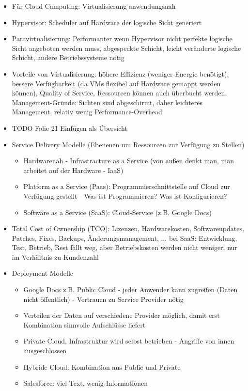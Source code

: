 \documentclass[paper=a4, fontsize=11pt]{scrartcl} %
\numberwithin{equation}{section} %
\numberwithin{figure}{section} %
\numberwithin{table}{section} %
\begin{document}
\begin{itemize}
  \item Für Cloud-Camputing: Virtualisierung anwendungsnah
  \item Hypervisor: Scheduler auf Hardware der logische Sicht generiert
  \item Paravirtualisierung: Performanter wenn Hypervisor nicht perfekte logische Sicht angeboten werden muss, abgespeckte Schicht, leicht veränderte logische Schicht, andere Betriebssysteme nötig
  \item Vorteile von Virtualisierung: höhere Effizienz (weniger Energie benötigt), bessere Verfügbarkeit (da VMs flexibel auf Hardware gemappt werden können), Quality of Service, Ressourcen können auch überbucht werden, Management-Gründe: Sichten sind abgeschirmt, daher leichteres Management, relativ wenig Performance-Overhead
  \item TODO Folie 21 Einfügen als Übersicht
  \item Service Delivery Modelle (Ebenenen um Ressourcen zur Verfügung zu Stellen)
  \begin{itemize}
    \item Hardwarenah - Infrastracture as a Service (von außen denkt man, man arbeitet auf der Hardware - IaaS)
    \item Platform as a Service (Paas): Programmierschnittstelle auf Cloud zur Verfügung gestellt - Was ist Programmieren? Was ist Konfigurieren?
    \item Software as a Service (SaaS): Cloud-Service (z.B. Google Docs)
  \end{itemize}
  \item Total Cost of Ownership (TCO): Lizenzen, Hardwarekosten, Softwareupdates, Patches, Fixes, Backups, Änderungsmanagement, ... bei SaaS: Entwicklung, Test, Betrieb, Rest fällt weg, aber Betriebskosten werden nicht weniger, nur im Verhältnis zu Kundenzahl
  \item Deployment Modelle
  \begin{itemize}
    \item Google Docs z.B. Public Cloud - jeder Anwender kann zugreifen (Daten nicht öffentlich) - Vertrauen zu Service Provider nötig
    \item Verteilen der Daten auf verschiedene Provider möglich, damit erst Kombination sinnvolle Aufschlüsse liefert
    \item Private Cloud, Infrastruktur wird selbst betrieben - Angriffe von innen ausgeschlossen
    \item Hybride Cloud: Kombination aus Public und Private
    \item Salesforce: viel Text, wenig Informationen

\end{itemize}
\end{itemize}
\end{document}
